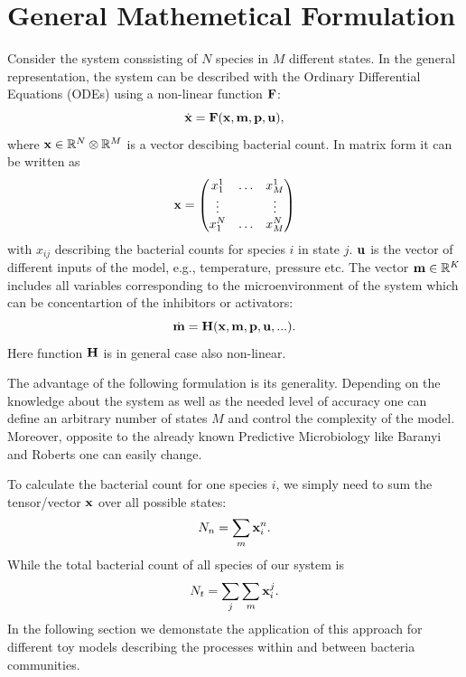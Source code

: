 \documentclass[10pt,A4paper]{article}
\begin{document}
\section{General Mathemetical Formulation}
Consider the system conssisting of $N$ species in $M$ different states.
In the general representation, the system can be described with the Ordinary Differential Equations (ODEs) using a non-linear function $\mathbf{F}$:
\begin{equation}
   \dot{\mathbf{x}} = \mathbf{F}(\mathbf{x}, \mathbf{m}, \mathbf{p}, \mathbf{u}),
   \label{eq:model_ODE}
\end{equation}
where  $\mathbf{x} \in \mathbb{R}^{N}  \otimes \mathbb{R}^{M}$ is a vector descibing bacterial count.
In matrix form it can be written as
\begin{equation}
    \mathbf{x} = \begin{pmatrix}
        x^1_1  & \dots & x^1_M  \\
        \vdots &       & \vdots \\
        x^N_1  & \dots & x^N_M  \\
            \end{pmatrix}
    \label{eq:model_bact}
\end{equation}
with $x_{ij}$ describing the bacterial counts for species $i$ in state $j$.
$\mathbf{u}$ is the vector of different inputs of the model, e.g., temperature, pressure etc.
The vector $\mathbf{m} \in \mathbb{R}^{K}$ includes all variables corresponding to the microenvironment of the system which can be concentartion of the inhibitors or activators:
\begin{equation}
    \dot{\mathbf{m}} = \mathbf{H} (\mathbf{x}, \mathbf{m}, \mathbf{p}, \mathbf{u}, ...).
    \label{eq:model_microenv}
\end{equation}
Here function $\mathbf{H}$ is in general case also non-linear.

The advantage of the following formulation is its generality. 
Depending on the knowledge about the system as well as the needed level of accuracy one can define an arbitrary number of states $M$ and control the complexity of the model.
Moreover, opposite to the already known Predictive Microbiology like Baranyi and Roberts one can easily change.

To calculate the bacterial count for one species $i$, we simply need to sum the tensor/vector $\mathbf{x}$ over all possible states:
\begin{equation}
    N_n = \sum_m \mathbf{x}_i^n.
\end{equation}
While the total bacterial count of all species of our system is
\begin{equation}
    N_t = \sum_j \sum_m \mathbf{x}_i^j.
\end{equation}
In the following section we demonstate the application of this approach for different toy models describing the processes within and between bacteria communities.
\end{document}
